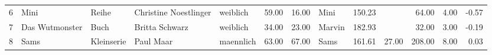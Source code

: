 \begin{sidewaystable}[ht]
\begin{center}
{\begin{tabular}{rllllrrlrrrrr}
  6 & Mini                                                                                                                                                                                                                                                            & Reihe & Christine Noestlinger                                                                                                                                                                                                                                           & weiblich & 59.00 & 16.00 & Mini                                                                                                                                                                                                                                                            & 150.23 &  & 64.00 & 4.00 & -0.57 \\ 
  7 & Das Wutmonster                                                                                                                                                                                                                                                  & Buch & Britta Schwarz                                                                                                                                                                                                                                                  & weiblich & 34.00 & 23.00 & Marvin                                                                                                                                                                                                                                                          & 182.93 &  & 32.00 & 3.00 & -0.19 \\ 
  8 & Sams                                                                                                                                                                                                                                                            & Kleinserie & Paul Maar                                                                                                                                                                                                                                                       & maennlich & 63.00 & 67.00 & Sams                                                                                                                                                                                                                                                            & 161.61 & 27.00 & 208.00 & 8.00 & 0.03 \\ 

\end{tabular}}
\end{center}
\end{sidewaystable}
